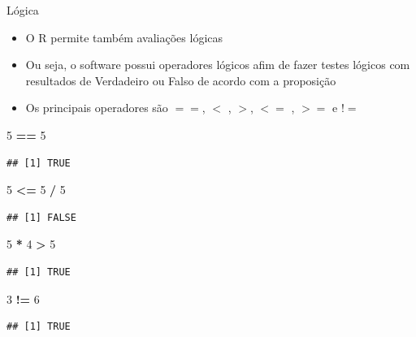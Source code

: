 \documentclass[
  10pt,
  ignorenonframetext,
]{beamer}
\newenvironment{Shaded}{\begin{snugshade}}{\end{snugshade}}
\newcommand{\DecValTok}[1]{\textcolor[rgb]{0.00,0.00,0.81}{#1}}
\newcommand{\OperatorTok}[1]{\textcolor[rgb]{0.81,0.36,0.00}{\textbf{#1}}}
\newcommand{\StringTok}[1]{\textcolor[rgb]{0.31,0.60,0.02}{#1}}
\providecommand{\tightlist}{%
  \setlength{\itemsep}{0pt}\setlength{\parskip}{0pt}}
\begin{document}
\begin{frame}[fragile]{Lógica}
\protect\hypertarget{luxf3gica}{}
\begin{itemize}
\tightlist
\item
  O R permite também avaliações lógicas
\item
  Ou seja, o software possui operadores lógicos afim de fazer testes
  lógicos com resultados de Verdadeiro ou Falso de acordo com a
  proposição
\item
  Os principais operadores são \(==\), \(<\) , \(>\), \(<=\) , \(>=\) e
  \(!=\)
\end{itemize}

\begin{Shaded}
\begin{Highlighting}[]
\DecValTok{5} \OperatorTok{==}\StringTok{ }\DecValTok{5}
\end{Highlighting}
\end{Shaded}

\begin{verbatim}
## [1] TRUE
\end{verbatim}

\begin{Shaded}
\begin{Highlighting}[]
\DecValTok{5} \OperatorTok{\textless{}=}\StringTok{ }\DecValTok{5} \OperatorTok{/}\StringTok{ }\DecValTok{5}
\end{Highlighting}
\end{Shaded}

\begin{verbatim}
## [1] FALSE
\end{verbatim}

\begin{Shaded}
\begin{Highlighting}[]
\DecValTok{5} \OperatorTok{*}\StringTok{ }\DecValTok{4} \OperatorTok{\textgreater{}}\StringTok{ }\DecValTok{5}
\end{Highlighting}
\end{Shaded}

\begin{verbatim}
## [1] TRUE
\end{verbatim}

\begin{Shaded}
\begin{Highlighting}[]
\DecValTok{3} \OperatorTok{!=}\StringTok{ }\DecValTok{6}
\end{Highlighting}
\end{Shaded}

\begin{verbatim}
## [1] TRUE
\end{verbatim}
\end{frame}
\end{document}

